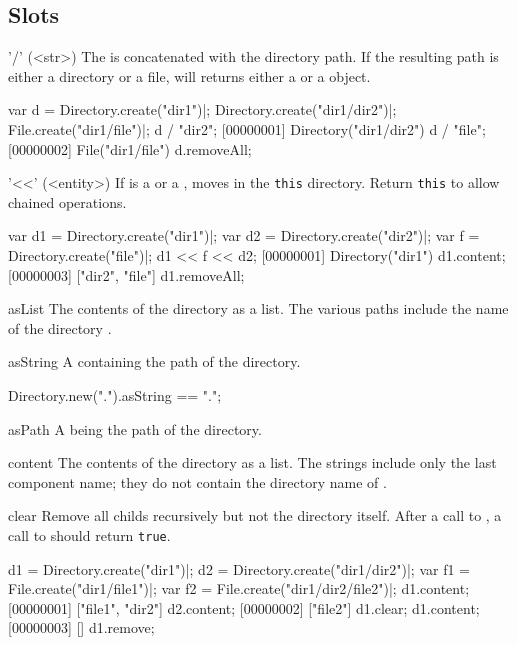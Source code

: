 \subsection{Slots}
\begin{urbiscriptapi}
\item['/'](<str>)
  The   is concatenated with the directory path.
  If the resulting path is either a directory or a file,  will
  returns either a  or a  object.
\begin{urbiscript}
var d = Directory.create("dir1")|;
Directory.create("dir1/dir2")|;
File.create("dir1/file")|;
d / "dir2";
[00000001] Directory("dir1/dir2")
d / "file";
[00000002] File("dir1/file")
d.removeAll;
\end{urbiscript}

\item['<<'](<entity>)
  If  is a  or a ,
   moves  in the \lstinline|this| directory.
  Return \lstinline|this| to allow chained operations.
\begin{urbiscript}
var d1 = Directory.create("dir1")|;
var d2 = Directory.create("dir2")|;
var f = Directory.create("file")|;
d1 << f << d2;
[00000001] Directory("dir1")
d1.content;
[00000003] ["dir2", "file"]
d1.removeAll;
\end{urbiscript}

\item[asList]
  The contents of the directory as a  list.  The
  various paths include the name of the directory \this.

\item[asString] A  containing the path of the directory.
\begin{urbiassert}
Directory.new(".").asString == ".";
\end{urbiassert}

\item[asPath] A  being the path of the directory.

\item[content]
  The contents of the directory as a  list.  The
  strings include only the last component name; they do not contain
  the directory name of \this.

\item[clear]
  Remove all childs recursively but not the directory itself. After a
  call to , a call to  should return
  \lstinline|true|.
\begin{urbiscript}
d1 = Directory.create("dir1")|;
d2 = Directory.create("dir1/dir2")|;
var f1 = File.create("dir1/file1")|;
var f2 = File.create("dir1/dir2/file2")|;
d1.content;
[00000001] ["file1", "dir2"]
d2.content;
[00000002] ["file2"]
d1.clear;
d1.content;
[00000003] []
d1.remove;
\end{urbiscript}


\end{urbiscriptapi}
